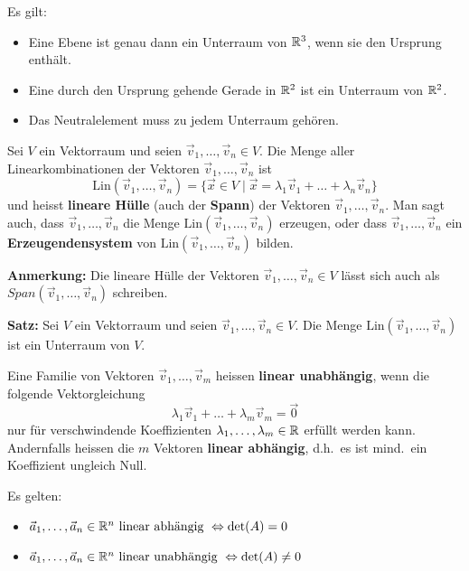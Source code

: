 Es gilt:
\begin{itemize}
    \item Eine Ebene ist genau dann ein Unterraum von $\mathbb{R}^3$, wenn sie den Ursprung enthält.
    \item Eine durch den Ursprung gehende Gerade in $\mathbb{R}^2$ ist ein Unterraum von $\mathbb{R}^2$.
    \item Das Neutralelement muss zu jedem Unterraum gehören.
\end{itemize}


Sei $V$ ein Vektorraum und seien $\vec{v}_1, \dots, \vec{v}_n \in V$.
Die Menge aller Linearkombinationen der Vektoren $\vec{v}_1, \dots, \vec{v}_n$ ist
\[\text{Lin}(\vec{v}_1, \dots, \vec{v}_n) = \{ \vec{x} \in V \mid \vec{x} = \lambda_1 \vec{v}_1 + \dots + \lambda_n \vec{v}_n\}\]
und heisst \textbf{lineare Hülle} (auch der \textbf{Spann}) der Vektoren $\vec{v}_1, \dots, \vec{v}_n$.
Man sagt auch, dass $\vec{v}_1, \dots, \vec{v}_n$ die Menge $\text{Lin}(\vec{v}_1, \dots, \vec{v}_n)$ erzeugen, oder dass $\vec{v}_1, \dots, \vec{v}_n$ ein \textbf{Erzeugendensystem} von $\text{Lin}(\vec{v}_1, \dots, \vec{v}_n)$ bilden.

\textbf{Anmerkung:} Die lineare Hülle der Vektoren $\vec{v}_1, \dots, \vec{v}_n \in V$ lässt sich auch als $Span(\vec{v}_1, \dots, \vec{v}_n)$ schreiben.

\textbf{Satz:} Sei $V$ ein Vektorraum und seien $\vec{v}_1, \dots, \vec{v}_n \in V$.
Die Menge $\text{Lin}(\vec{v}_1, \dots, \vec{v}_n)$ ist ein Unterraum von $V$.


Eine Familie von Vektoren $\vec{v}_1, \dots, \vec{v}_m$ heissen \textbf{linear unabhängig}, wenn die folgende Vektorgleichung \[\lambda_1 \vec{v}_1 + \dots + \lambda_m \vec{v}_m = \vec{0}\] nur für verschwindende Koeffizienten $\lambda_1, \dots, \lambda_m \in \mathbb{R}$ erfüllt werden kann.
Andernfalls heissen die $m$ Vektoren \textbf{linear abhängig}, d.h.\ es ist mind.\ ein Koeffizient ungleich Null.

Es gelten:
\begin{itemize}
    \item $\vec{a}_1, \dots, \vec{a}_n \in \mathbb{R}^n \text{ linear abhängig } \Leftrightarrow \det(A) = 0$
    \item $\vec{a}_1, \dots, \vec{a}_n \in \mathbb{R}^n \text{ linear unabhängig } \Leftrightarrow \det(A) \neq 0$
\end{itemize}

